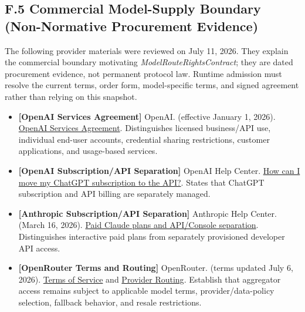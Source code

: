 \documentclass[
  11pt,
]{article}
\providecommand{\tightlist}{%
  \setlength{\itemsep}{0pt}\setlength{\parskip}{0pt}}
\begin{document}
\hypertarget{f.5-commercial-model-supply-boundary}{%
\subsection{F.5 Commercial Model-Supply Boundary (Non-Normative Procurement
Evidence)}\label{f.5-commercial-model-supply-boundary}}

The following provider materials were reviewed on July 11, 2026. They explain
the commercial boundary motivating \emph{ModelRouteRightsContract}; they are
dated procurement evidence, not permanent protocol law. Runtime admission
must resolve the current terms, order form, model-specific terms, and signed
agreement rather than relying on this snapshot.

\begin{itemize}
\tightlist
\item
  \textbf{{[}OpenAI Services Agreement{]}} OpenAI. (effective January 1,
  2026). \href{https://openai.com/policies/services-agreement/}{OpenAI
  Services Agreement}. Distinguishes licensed business/API use, individual
  end-user accounts, credential sharing restrictions, customer applications,
  and usage-based services.
\item
  \textbf{{[}OpenAI Subscription/API Separation{]}} OpenAI Help Center.
  \href{https://help.openai.com/en/articles/8156019}{How can I move my
  ChatGPT subscription to the API?}. States that ChatGPT subscription and API
  billing are separately managed.
\item
  \textbf{{[}Anthropic Subscription/API Separation{]}} Anthropic Help
  Center. (March 16, 2026).
  \href{https://support.claude.com/en/articles/9876003-i-have-a-paid-claude-subscription-pro-max-team-or-enterprise-plans-why-do-i-have-to-pay-separately-to-use-the-claude-api-and-console}{Paid
  Claude plans and API/Console separation}. Distinguishes interactive paid
  plans from separately provisioned developer API access.
\item
  \textbf{{[}OpenRouter Terms and Routing{]}} OpenRouter. (terms updated
  July 6, 2026). \href{https://openrouter.ai/terms/}{Terms of Service} and
  \href{https://openrouter.ai/docs/guides/routing/provider-selection}{Provider
  Routing}. Establish that aggregator access remains subject to applicable
  model terms, provider/data-policy selection, fallback behavior, and resale
  restrictions.
\end{itemize}
\end{document}
